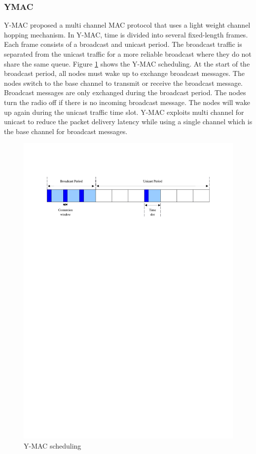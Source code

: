 \subsubsection{YMAC}
Y-MAC \cite{y-mac} proposed a multi channel MAC protocol that uses a light weight channel hopping mechanism. In Y-MAC, time is divided into several fixed-length frames. Each frame consists of a broadcast and unicast period. The broadcast traffic is separated from the unicast traffic for a more reliable broadcast where they do not share the same queue. Figure \ref{fig_ymac} shows the Y-MAC scheduling. At the start of the broadcast period, all nodes must wake up to exchange broadcast messages. The nodes switch to the base channel to transmit or receive the broadcast message. Broadcast messages are only exchanged during the broadcast period. The nodes turn the radio off if there is no incoming broadcast message. The nodes will wake up again during the unicast traffic time slot. Y-MAC exploits multi channel for unicast to reduce the packet delivery latency while using a single channel which is the base channel for broadcast messages.

\begin{figure}
\centering
\includegraphics[trim=2cm 22cm 2cm 3cm, clip=true, totalheight=0.17\textheight]{ymac.pdf}
\caption{Y-MAC scheduling}
\label{fig_ymac}
\end{figure}

